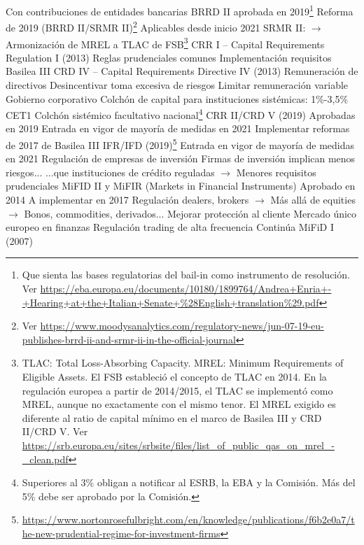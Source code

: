 \documentclass{nuevotema}
\begin{document}
\begin{esquemal}
				\4[] Con contribuciones de entidades bancarias
				\4 BRRD II aprobada en 2019\footnote{Que sienta las bases regulatorias del bail-in como instrumento de resolución. Ver \url{https://eba.europa.eu/documents/10180/1899764/Andrea+Enria+-+Hearing+at+the+Italian+Senate+\%28English+translation\%29.pdf}}
				\4 Reforma de 2019 (BRRD II/SRMR II)\footnote{Ver \url{https://www.moodysanalytics.com/regulatory-news/jun-07-19-eu-publishes-brrd-ii-and-srmr-ii-in-the-official-journal}}
				\4[] Aplicables desde inicio 2021
				\4[] SRMR II:
				\4[] $\to$ Armonización de MREL a TLAC de FSB\footnote{TLAC: Total Loss-Absorbing Capacity. MREL: Minimum Requirements of Eligible Assets. El FSB estableció el concepto de TLAC en 2014. En la regulación europea a partir de 2014/2015, el TLAC se implementó como MREL, aunque no exactamente con el mismo tenor. El MREL exigido es diferente al ratio de capital mínimo en el marco de Basilea III y CRD II/CRD V. Ver \url{https://srb.europa.eu/sites/srbsite/files/list_of_public_qas_on_mrel_-_clean.pdf}}
			\3 CRR I -- Capital Requirements Regulation I (2013)
				\4 Reglas prudenciales comunes
				\4 Implementación requisitos Basilea III
			\3 CRD IV -- Capital Requirements Directive IV (2013)
				\4 Remuneración de directivos
				\4[] Desincentivar toma excesiva de riesgos
				\4[] Limitar remuneración variable
				\4 Gobierno corporativo
				\4 Colchón de capital para instituciones sistémicas: 1\%-3,5\% CET1
				\4 Colchón sistémico facultativo nacional\footnote{Superiores al 3\% obligan a notificar al ESRB, la EBA y la Comisión. Más del 5\% debe ser aprobado por la Comisión.}
			\3 CRR II/CRD V (2019)
				\4 Aprobadas en 2019
				\4 Entrada en vigor de mayoría de medidas en 2021
				\4 Implementar reformas de 2017 de Basilea III
			\3 IFR/IFD (2019)\footnote{\url{https://www.nortonrosefulbright.com/en/knowledge/publications/f6b2e0a7/the-new-prudential-regime-for-investment-firms}}
				\4 Entrada en vigor de mayoría de medidas en 2021
				\4 Regulación de empresas de inversión
				\4 Firmas de inversión implican menos riesgos...
				\4[] ...que instituciones de crédito reguladas
				\4[] $\to$ Menores requisitos prudenciales
			\3 MiFID II y MiFIR (Markets in Financial Instruments)
				\4 Aprobado en 2014
				\4 A implementar en 2017
				\4 Regulación dealers, brokers
				\4[] $\to$ Más allá de equities
				\4[] $\to$ Bonos, commodities, derivados...
				\4 Mejorar protección al cliente
				\4 Mercado único europeo en finanzas
				\4 Regulación trading de alta frecuencia
				\4 Continúa
				\4[] MiFiD I (2007)

\end{esquemal}
\end{document}
